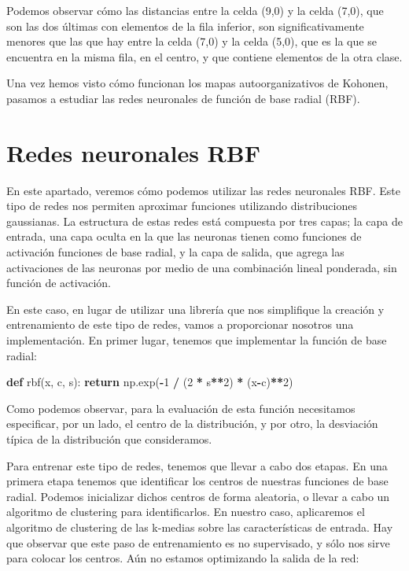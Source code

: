 \documentclass[
  a4paper,
,tablecaptionabove
]{scrartcl}
\newenvironment{Shaded}{\begin{snugshade}}{\end{snugshade}}
\newcommand{\ControlFlowTok}[1]{\textcolor[rgb]{0.13,0.29,0.53}{\textbf{#1}}}
\newcommand{\DecValTok}[1]{\textcolor[rgb]{0.00,0.00,0.81}{#1}}
\newcommand{\KeywordTok}[1]{\textcolor[rgb]{0.13,0.29,0.53}{\textbf{#1}}}
\newcommand{\NormalTok}[1]{#1}
\newcommand{\OperatorTok}[1]{\textcolor[rgb]{0.81,0.36,0.00}{\textbf{#1}}}
\begin{document}
Podemos observar cómo las distancias entre la celda (9,0) y la celda
(7,0), que son las dos últimas con elementos de la fila inferior, son
significativamente menores que las que hay entre la celda (7,0) y la
celda (5,0), que es la que se encuentra en la misma fila, en el centro,
y que contiene elementos de la otra clase.

Una vez hemos visto cómo funcionan los mapas autoorganizativos de
Kohonen, pasamos a estudiar las redes neuronales de función de base
radial (RBF).

\hypertarget{redes-neuronales-rbf}{%
\section{Redes neuronales RBF}\label{redes-neuronales-rbf}}

En este apartado, veremos cómo podemos utilizar las redes neuronales
RBF. Este tipo de redes nos permiten aproximar funciones utilizando
distribuciones gaussianas. La estructura de estas redes está compuesta
por tres capas; la capa de entrada, una capa oculta en la que las
neuronas tienen como funciones de activación funciones de base radial, y
la capa de salida, que agrega las activaciones de las neuronas por medio
de una combinación lineal ponderada, sin función de activación.

En este caso, en lugar de utilizar una librería que nos simplifique la
creación y entrenamiento de este tipo de redes, vamos a proporcionar
nosotros una implementación. En primer lugar, tenemos que implementar la
función de base radial:

\begin{Shaded}
\begin{Highlighting}[]
\KeywordTok{def}\NormalTok{ rbf(x, c, s):}
    \ControlFlowTok{return}\NormalTok{ np.exp(}\OperatorTok{-}\DecValTok{1} \OperatorTok{/}\NormalTok{ (}\DecValTok{2} \OperatorTok{*}\NormalTok{ s}\OperatorTok{**}\DecValTok{2}\NormalTok{) }\OperatorTok{*}\NormalTok{ (x}\OperatorTok{-}\NormalTok{c)}\OperatorTok{**}\DecValTok{2}\NormalTok{)}
\end{Highlighting}
\end{Shaded}

Como podemos observar, para la evaluación de esta función necesitamos
especificar, por un lado, el centro de la distribución, y por otro, la
desviación típica de la distribución que consideramos.

Para entrenar este tipo de redes, tenemos que llevar a cabo dos etapas.
En una primera etapa tenemos que identificar los centros de nuestras
funciones de base radial. Podemos inicializar dichos centros de forma
aleatoria, o llevar a cabo un algoritmo de clustering para
identificarlos. En nuestro caso, aplicaremos el algoritmo de clustering
de las k-medias sobre las características de entrada. Hay que observar
que este paso de entrenamiento es no supervisado, y sólo nos sirve para
colocar los centros. Aún no estamos optimizando la salida de la red:
\end{document}
